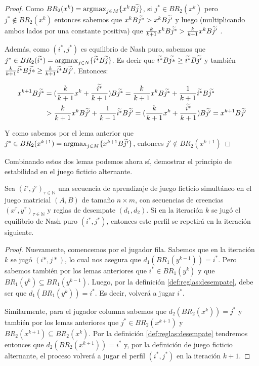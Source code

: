 \begin{proof}
    Como $BR_2(x^{k}) = \operatorname*{argmax}_{j \in M} \{x^k B \widetilde{j}\}$, si $j^* \in BR_2(x^k)$ pero $j^* \notin BR_2(x^k)$ entonces sabemos que $x^k B \widetilde{j^*} > x^k B \widetilde{j'}$ y luego (multiplicando ambos lados por una constante positiva) que $\frac{k}{k+1} x^k B \widetilde{j^*} > \frac{k}{k+1} x^k B \widetilde{j'}$ .

    Además, como $(i^*, j^*)$ es equilibrio de Nash puro, sabemos que $j^* \in BR_2(\widetilde{i^*}) = \operatorname*{argmax}_{j \in N} \{\widetilde{i^*}B\widetilde{j}\}$. Es decir que $\widetilde{i^*}B\widetilde{j*} \ge \widetilde{i^*}B\widetilde{j'}$ y también $\frac{k}{k+1} \widetilde{i^*}B\widetilde{j*} \ge \frac{k}{k+1} \widetilde{i^*}B\widetilde{j'}$. Entonces:

    \begin{align*}
        x^{k+1}B\widetilde{j^*} &= (\frac{k}{k+1} x^{k} + \frac{\widetilde{i^*}}{k+1})B\widetilde{j^*} = \frac{k}{k+1} x^{k}B\widetilde{j^*} + \frac{1}{k+1}\widetilde{i^*}B\widetilde{j^*} \\
        &> \frac{k}{k+1} x^{k}B\widetilde{j'} + \frac{1}{k+1}\widetilde{i^*}B\widetilde{j'} = (\frac{k}{k+1} x^{k} + \frac{\widetilde{i^*}}{k+1})B\widetilde{j'} = x^{k+1}B\widetilde{j'}
    \end{align*}

    Y como sabemos por el lema anterior que $j^* \in BR_2(x^{k+1}) = \operatorname*{argmax}_{j \in M} \{x^{k+1}B\widetilde{j'}\}$, entonces $j' \notin BR_2(x^{k+1})$

    
\end{proof}

Combinando estos dos lemas podemos ahora sí, demostrar el principio de estabilidad en el juego ficticio alternante.

\begin{theorem}
    Sea $(i^\tau, j^\tau)_{\tau \in \mathbb{N}}$ una secuencia de aprendizaje de juego ficticio simultáneo en el juego matricial $(A, B)$ de tamaño $n \times m$, con secuencias de creencias $(x^\tau, y^\tau)_{\tau \in \mathbb{N}}$ y reglas de desempate $(d_1, d_2)$. Si en la iteración $k$ se jugó el equilibrio de Nash puro $(i^*, j^*)$, entonces este perfil se repetirá en la iteración siguiente.
\end{theorem}

\begin{proof}
    Nuevamente, comencemos por el jugador fila. Sabemos que en la iteración $k$ se jugó $(i*, j*)$, lo cual nos asegura que $d_1(BR_1(y^{k-1})) = i^*$. Pero sabemos también por los lemas anteriores que $i^* \in BR_1(y^{k})$ y que $BR_1(y^{k}) \subseteq BR_1(y^{k-1})$. Luego, por la definición \ref{def:reglas:desempate}, debe ser que $d_1(BR_1(y^k)) = i^*$. Es decir, volverá a jugar $i^*$.

    Similarmente, para el jugador columna sabemos que $d_2(BR_2(x^{k})) = j^*$ y también por los lemas anteriores que $j^* \in BR_2(x^{k+1})$ y $BR_2(x^{k+1}) \subseteq BR_2(x^{k})$. Por la definición \ref{def:reglas:desempate} tendremos entonces que $d_2(BR_2(x^{k+1})) = i^*$ y, por la definición de juego ficticio alternante, el proceso volverá a jugar el perfil $(i^*, j^*)$ en la iteración $k+1$.
\end{proof}


